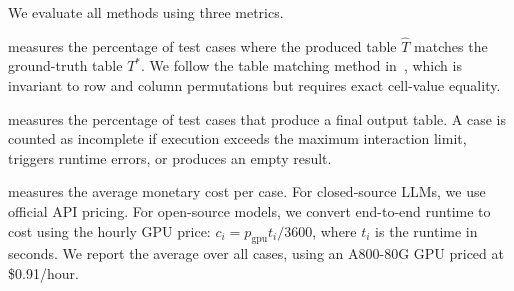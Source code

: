 We evaluate all methods using three metrics.

 measures the percentage of test cases where the produced table $\hat{T}$ matches the ground-truth table $T^*$. We follow the table matching method in~\cite{ge2025text}, which is invariant to row and column permutations but requires exact cell-value equality.

 measures the percentage of test cases that produce a final output table. A case is counted as incomplete if execution exceeds the maximum interaction limit, triggers runtime errors, or produces an empty result.


 measures the average monetary cost per case. For closed-source LLMs, we use official API pricing. For open-source models, we convert end-to-end runtime to cost using the hourly GPU price:
$c_i = p_{\text{gpu}} t_i / 3600$,
where $t_i$ is the runtime in seconds. We report the average over all cases, using an A800-80G GPU priced at \$0.91/hour.




